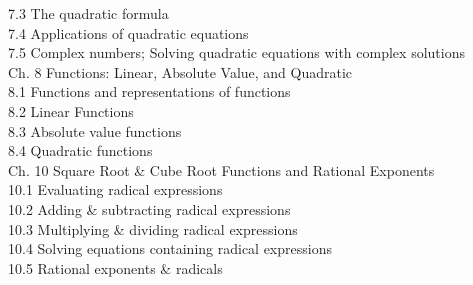 \documentclass{ximera}
\begin{document}
7.3 The quadratic formula\\
7.4 Applications of quadratic equations\\
7.5 Complex numbers; Solving quadratic equations with complex solutions\\
Ch. 8 Functions: Linear, Absolute Value, and Quadratic\\
8.1 Functions and representations of functions\\
8.2 Linear Functions\\
8.3 Absolute value functions\\
8.4 Quadratic functions\\
Ch. 10 Square Root \& Cube Root Functions and Rational Exponents\\
10.1 Evaluating radical expressions\\
10.2 Adding \& subtracting radical expressions\\
10.3 Multiplying \& dividing radical expressions\\
10.4 Solving equations containing radical expressions\\
10.5 Rational exponents \& radicals
\end{document}
